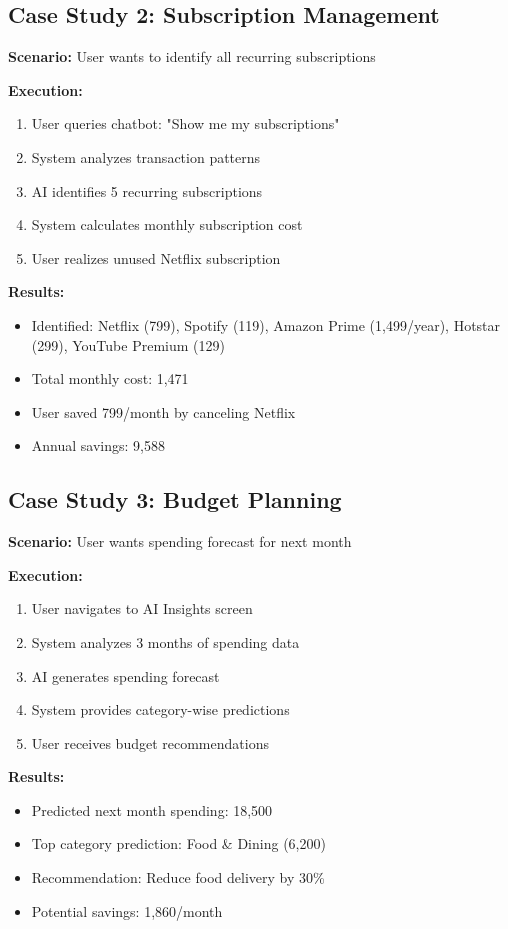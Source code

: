 \documentclass[11pt,a4paper]{report}
\begin{document}
\subsection{Case Study 2: Subscription Management}

\textbf{Scenario:} User wants to identify all recurring subscriptions

\textbf{Execution:}
\begin{enumerate}
    \item User queries chatbot: "Show me my subscriptions"
    \item System analyzes transaction patterns
    \item AI identifies 5 recurring subscriptions
    \item System calculates monthly subscription cost
    \item User realizes unused Netflix subscription
\end{enumerate}

\textbf{Results:}
\begin{itemize}
    \item Identified: Netflix (799), Spotify (119), Amazon Prime (1,499/year), Hotstar (299), YouTube Premium (129)
    \item Total monthly cost: 1,471
    \item User saved 799/month by canceling Netflix
    \item Annual savings: 9,588
\end{itemize}

\subsection{Case Study 3: Budget Planning}

\textbf{Scenario:} User wants spending forecast for next month

\textbf{Execution:}
\begin{enumerate}
    \item User navigates to AI Insights screen
    \item System analyzes 3 months of spending data
    \item AI generates spending forecast
    \item System provides category-wise predictions
    \item User receives budget recommendations
\end{enumerate}

\textbf{Results:}
\begin{itemize}
    \item Predicted next month spending: 18,500
    \item Top category prediction: Food \& Dining (6,200)
    \item Recommendation: Reduce food delivery by 30\%
    \item Potential savings: 1,860/month
\end{itemize}
\end{document}
